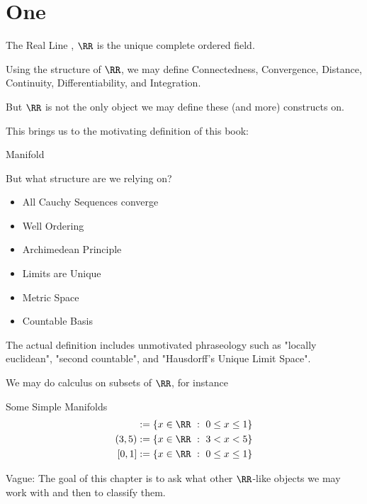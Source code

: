 \chapter{One}

The Real Line , \( \RR \) is the unique complete ordered field.

Using the structure of \( \RR \),
    we may define Connectedness, Convergence, Distance, Continuity, Differentiability, and Integration.

But \( \RR \) is not the only object we may define these (and more) constructs on.

This brings us to the motivating definition of this book:
\begin{boxIntuition}{Manifold}
\begin{boxTODO}{}
\end{boxTODO}

But what structure are we relying on?
\begin{itemize}
    \item All Cauchy Sequences converge
    \item Well Ordering
    \item Archimedean Principle
    \item Limits are Unique
    \item Metric Space
    \item Countable Basis
\end{itemize}

The actual definition includes unmotivated phraseology such as "locally euclidean", "second countable", and "Hausdorff's Unique Limit Space".
\end{boxIntuition}
We may do calculus on subsets of \( \RR \), for instance 
\begin{boxExample}{Some Simple Manifolds}
\begin{align*} 
    [0, 1] &:= \{ x \in \RR\ :\ 0 \leq x \leq 1 \}\\
    (3, 5) &:= \{ x \in \RR\ :\ 3 < x < 5 \}\\
    [0, 1] &:= \{ x \in \RR\ :\ 0 \leq x \leq 1 \}\\
\end{align*}
\end{boxExample}


\begin{boxTODO}{}
Vague:
The goal of this chapter is to ask what other \( \RR \)-like objects we may work with
    and then to classify them.
\end{boxTODO}


